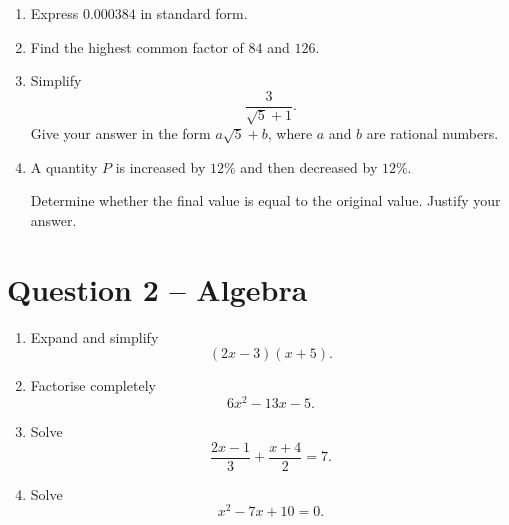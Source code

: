 	\begin{enumerate}
		
		\item[(a)]
		Express \(0.000384\) in standard form.
		
		\vspace{15mm}
		
		\item[(b)]
		Find the highest common factor of \(84\) and \(126\).
		
		\vspace{15mm}
		
		\item[(c)]
		Simplify
		\[
		\frac{3}{\sqrt{5}+1}.
		\]
		Give your answer in the form \(a\sqrt{5}+b\), where \(a\) and \(b\) are rational numbers.
		
		\vspace{25mm}
		
		\item[(d)]
		A quantity \(P\) is increased by \(12\%\) and then decreased by \(12\%\).
		
		Determine whether the final value is equal to the original value. Justify your answer.
		
	\end{enumerate}
	
	\newpage
	
	\section*{Question 2 -- Algebra }
	
	\begin{enumerate}
		
		\item[(a)]
		Expand and simplify
		\[
		(2x-3)(x+5).
		\]
		
		\vspace{15mm}
		
		\item[(b)]
		Factorise completely
		\[
		6x^2-13x-5.
		\]
		
		\vspace{15mm}
		
		\item[(c)]
		Solve
		\[
		\frac{2x-1}{3}+\frac{x+4}{2}=7.
		\]
		
		\vspace{20mm}
		
		\item[(d)]
		Solve
		\[
		x^2-7x+10=0.
		\]
		
	\end{enumerate}
	

